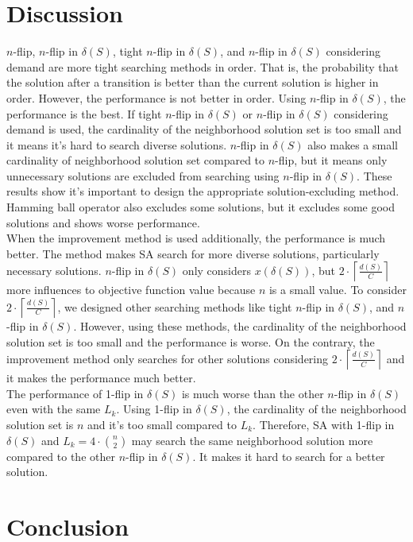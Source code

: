 \documentclass[11pt]{article}
\begin{document}
\begin{spacing}{1.5}
\newpage
{\centering\section{Discussion}}
$n$-flip, $n$-flip in $\delta(S)$, tight $n$-flip in $\delta(S)$, and $n$-flip in $\delta(S)$ considering demand are more tight searching methods in order. That is, the probability that the solution after a transition is better than the current solution is higher in order. However, the performance is not better in order. Using $n$-flip in $\delta(S)$, the performance is the best. If tight $n$-flip in $\delta(S)$ or $n$-flip in $\delta(S)$ considering demand
is used, the cardinality of the neighborhood solution set is too small and it means it's hard to search diverse solutions. $n$-flip in $\delta(S)$ also makes a small cardinality of neighborhood solution set compared to $n$-flip, but it means only unnecessary solutions are excluded from searching using $n$-flip in $\delta(S)$. These results show it's important to design the appropriate solution-excluding method. Hamming ball operator also excludes some solutions, but it excludes some good solutions and shows worse performance.\\
\indent When the improvement method is used additionally, the performance is much better. The method makes SA search for more diverse solutions, particularly necessary solutions. $n$-flip in $\delta(S)$ only considers $x(\delta(S))$, but $2\cdot\left\lceil\frac{d(S)}{C}\right\rceil$ more influences to objective function value because $n$ is a small value.
To consider $2\cdot\left\lceil\frac{d(S)}{C}\right\rceil$, we designed other searching methods like tight $n$-flip in $\delta(S)$, and $n$-flip in $\delta(S)$. However, using these methods, the cardinality of the neighborhood solution set is too small and the performance is worse. On the contrary, the improvement method only searches for other solutions considering $2\cdot\left\lceil\frac{d(S)}{C}\right\rceil$ and it makes the performance much better.\\
\indent The performance of 1-flip in $\delta(S)$ is much worse than the other $n$-flip in $\delta(S)$ even with the same $L_k$. Using 1-flip in $\delta(S)$, the cardinality of the neighborhood solution set is $n$ and it's too small compared to $L_k$. Therefore, SA with 1-flip in $\delta(S)$ and $L_k = 4\cdot \binom n2$ may search the same neighborhood solution more compared to the other $n$-flip in $\delta(S)$. It makes it hard to search for a better solution.
\newpage
{\centering\section{Conclusion}}

\end{spacing}
\end{document}

